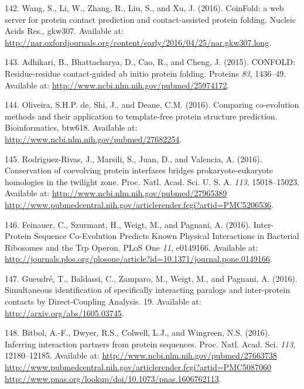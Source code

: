 \documentclass[11pt,a4paper,twoside]{book}
\theoremstyle{definition}
\theoremstyle{definition}
\theoremstyle{remark}
\begin{document}
\hypertarget{ref-Wang2016}{}
142. Wang, S., Li, W., Zhang, R., Liu, S., and Xu, J. (2016). CoinFold:
a web server for protein contact prediction and contact-assisted protein
folding. Nucleic Acids Res., gkw307. Available at:
\url{http://nar.oxfordjournals.org/content/early/2016/04/25/nar.gkw307.long}.

\hypertarget{ref-Adhikari2015a}{}
143. Adhikari, B., Bhattacharya, D., Cao, R., and Cheng, J. (2015).
CONFOLD: Residue-residue contact-guided ab initio protein folding.
Proteins \emph{83}, 1436--49. Available at:
\url{http://www.ncbi.nlm.nih.gov/pubmed/25974172}.

\hypertarget{ref-DeOliveira2016}{}
144. Oliveira, S.H.P. de, Shi, J., and Deane, C.M. (2016). Comparing
co-evolution methods and their application to template-free protein
structure prediction. Bioinformatics, btw618. Available at:
\url{http://www.ncbi.nlm.nih.gov/pubmed/27682254}.

\hypertarget{ref-Rodriguez-Rivas2016}{}
145. Rodriguez-Rivas, J., Marsili, S., Juan, D., and Valencia, A.
(2016). Conservation of coevolving protein interfaces bridges
prokaryote-eukaryote homologies in the twilight zone. Proc. Natl. Acad.
Sci. U. S. A. \emph{113}, 15018--15023. Available at:
\href{http://www.ncbi.nlm.nih.gov/pubmed/27965389\%20http://www.pubmedcentral.nih.gov/articlerender.fcgi?artid=PMC5206536}{http://www.ncbi.nlm.nih.gov/pubmed/27965389 http://www.pubmedcentral.nih.gov/articlerender.fcgi?artid=PMC5206536}.

\hypertarget{ref-Feinauer2016a}{}
146. Feinauer, C., Szurmant, H., Weigt, M., and Pagnani, A. (2016).
Inter-Protein Sequence Co-Evolution Predicts Known Physical Interactions
in Bacterial Ribosomes and the Trp Operon. PLoS One \emph{11}, e0149166.
Available at:
\url{http://journals.plos.org/plosone/article?id=10.1371/journal.pone.0149166}.

\hypertarget{ref-Gueudre2016}{}
147. Gueudré, T., Baldassi, C., Zamparo, M., Weigt, M., and Pagnani, A.
(2016). Simultaneous identification of specifically interacting paralogs
and inter-protein contacts by Direct-Coupling Analysis. 19. Available
at: \url{http://arxiv.org/abs/1605.03745}.

\hypertarget{ref-Bitbol2016}{}
148. Bitbol, A.-F., Dwyer, R.S., Colwell, L.J., and Wingreen, N.S.
(2016). Inferring interaction partners from protein sequences. Proc.
Natl. Acad. Sci. \emph{113}, 12180--12185. Available at:
\href{http://www.ncbi.nlm.nih.gov/pubmed/27663738\%20http://www.pubmedcentral.nih.gov/articlerender.fcgi?artid=PMC5087060\%20http://www.pnas.org/lookup/doi/10.1073/pnas.1606762113}{http://www.ncbi.nlm.nih.gov/pubmed/27663738 http://www.pubmedcentral.nih.gov/articlerender.fcgi?artid=PMC5087060 http://www.pnas.org/lookup/doi/10.1073/pnas.1606762113}.
\end{document}
